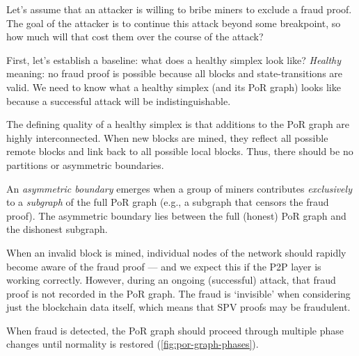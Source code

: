 Let's assume that an attacker is willing to bribe miners to exclude a fraud proof.
The goal of the attacker is to continue this attack beyond some breakpoint, so how much will that cost them over the course of the attack?

First, let's establish a baseline: what does a healthy simplex look like?
\emph{Healthy} meaning: no fraud proof is possible because all blocks and state-transitions are valid.
We need to know what a healthy simplex (and its PoR graph) looks like because a successful attack will be indistinguishable.

The defining quality of a healthy simplex is that additions to the PoR graph are highly interconnected.
When new blocks are mined, they reflect all possible remote blocks and link back to all possible local blocks.
Thus, there should be no partitions or asymmetric boundaries.


An \emph{asymmetric boundary} emerges when a group of miners contributes \emph{exclusively} to a \emph{subgraph} of the full PoR graph (e.g., a subgraph that censors the fraud proof).
The asymmetric boundary lies between the full (honest) PoR graph and the dishonest subgraph.



When an invalid block is mined, individual nodes of the network should rapidly become aware of the fraud proof --- and we expect this if the P2P layer is working correctly.
However, during an ongoing (successful) attack, that fraud proof is not recorded in the PoR graph.
The fraud is `invisible' when considering just the blockchain data itself, which means that SPV proofs may be fraudulent.

When fraud is detected, the PoR graph should proceed through multiple phase changes until normality is restored (\autoref{fig:por-graph-phases}).


